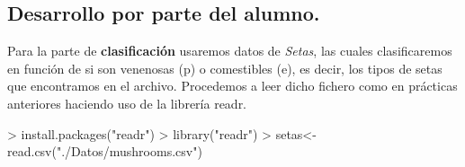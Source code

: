 \documentclass [a4paper] {article}
\begin{document}
\subsection{Desarrollo por parte del alumno.}

\bigskip
Para la parte de \textbf{clasificación} usaremos datos de \textit{Setas}, las cuales clasificaremos en función de si son venenosas (p) o 
comestibles (e), es decir, los tipos de setas que encontramos en el archivo. Procedemos a leer dicho fichero como en prácticas anteriores
haciendo uso de la librería readr.
\begin{Schunk}
\begin{Sinput}
> install.packages("readr")
> library("readr")
> setas<-read.csv("./Datos/mushrooms.csv")
\end{Sinput}
\end{Schunk}
\end{document}
